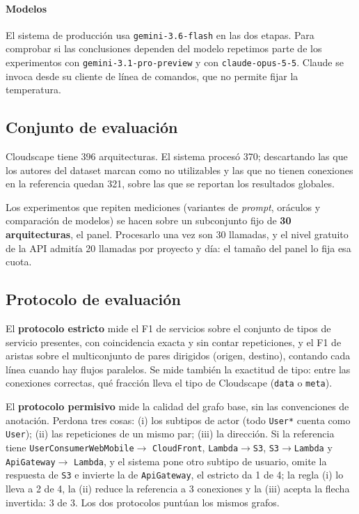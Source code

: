 \documentclass[a4paper, twocolumn, 10pt]{IEEEtran}
\begin{document}
\paragraph{Modelos} El sistema de producción usa \texttt{gemini-3.6-flash} en las
dos etapas. Para comprobar si las conclusiones dependen del modelo repetimos parte
de los experimentos con \texttt{gemini-3.1-pro-preview} y con
\texttt{claude-opus-5-5}. Claude se invoca desde su cliente de línea de comandos,
que no permite fijar la temperatura.

\subsection{Conjunto de evaluación}

Cloudscape tiene 396 arquitecturas. El sistema procesó 370; descartando las que los
autores del dataset marcan como no utilizables y las que no tienen conexiones en la
referencia quedan 321, sobre las que se reportan los resultados globales.

Los experimentos que repiten mediciones (variantes de \emph{prompt}, oráculos y
comparación de modelos) se hacen sobre un subconjunto fijo de \textbf{30
arquitecturas}, el panel. Procesarlo una vez son 30 llamadas, y el nivel gratuito de
la API admitía 20 llamadas por proyecto y día: el tamaño del panel lo fija esa
cuota.

\subsection{Protocolo de evaluación}

El \textbf{protocolo estricto} mide el F1 de servicios sobre el conjunto de tipos de
servicio presentes, con coincidencia exacta y sin contar repeticiones, y el F1 de
aristas sobre el multiconjunto de pares dirigidos (origen, destino), contando cada
línea cuando hay flujos paralelos. Se mide también la exactitud de tipo: entre las
conexiones correctas, qué fracción lleva el tipo de Cloudscape (\texttt{data} o
\texttt{meta}).

El \textbf{protocolo permisivo} mide la calidad del grafo base, sin las convenciones
de anotación. Perdona tres cosas: (i) los subtipos de actor (todo \texttt{User*}
cuenta como \texttt{User}); (ii) las repeticiones de un mismo par; (iii) la
dirección. Si la referencia tiene \texttt{UserConsumerWebMobile}$\rightarrow$%
\texttt{CloudFront}, \texttt{Lambda}$\rightarrow$\texttt{S3},
\texttt{S3}$\rightarrow$\texttt{Lambda} y \texttt{ApiGateway}$\rightarrow$%
\texttt{Lambda}, y el sistema pone otro subtipo de usuario, omite la respuesta de
\texttt{S3} e invierte la de \texttt{ApiGateway}, el estricto da 1 de 4; la regla
(i) lo lleva a 2 de 4, la (ii) reduce la referencia a 3 conexiones y la (iii) acepta
la flecha invertida: 3 de 3. Los dos protocolos puntúan los mismos grafos.
\end{document}
